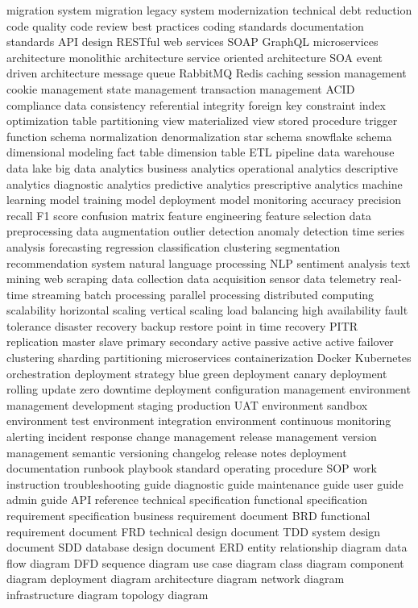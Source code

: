 \documentclass[a4paper,10pt]{article}
\begin{document}
{migration system migration legacy system modernization technical debt reduction code quality code review best practices coding standards documentation standards API design RESTful web services SOAP GraphQL microservices architecture monolithic architecture service oriented architecture SOA event driven architecture message queue RabbitMQ Redis caching session management cookie management state management transaction management ACID compliance data consistency referential integrity foreign key constraint index optimization table partitioning view materialized view stored procedure trigger function schema normalization denormalization star schema snowflake schema dimensional modeling fact table dimension table ETL pipeline data warehouse data lake big data analytics business analytics operational analytics descriptive analytics diagnostic analytics predictive analytics prescriptive analytics machine learning model training model deployment model monitoring accuracy precision recall F1 score confusion matrix feature engineering feature selection data preprocessing data augmentation outlier detection anomaly detection time series analysis forecasting regression classification clustering segmentation recommendation system natural language processing NLP sentiment analysis text mining web scraping data collection data acquisition sensor data telemetry real-time streaming batch processing parallel processing distributed computing scalability horizontal scaling vertical scaling load balancing high availability fault tolerance disaster recovery backup restore point in time recovery PITR replication master slave primary secondary active passive active active failover clustering sharding partitioning microservices containerization Docker Kubernetes orchestration deployment strategy blue green deployment canary deployment rolling update zero downtime deployment configuration management environment management development staging production UAT environment sandbox environment test environment integration environment continuous monitoring alerting incident response change management release management version management semantic versioning changelog release notes deployment documentation runbook playbook standard operating procedure SOP work instruction troubleshooting guide diagnostic guide maintenance guide user guide admin guide API reference technical specification functional specification requirement specification business requirement document BRD functional requirement document FRD technical design document TDD system design document SDD database design document ERD entity relationship diagram data flow diagram DFD sequence diagram use case diagram class diagram component diagram deployment diagram architecture diagram network diagram infrastructure diagram topology diagram
}%
\end{document}
